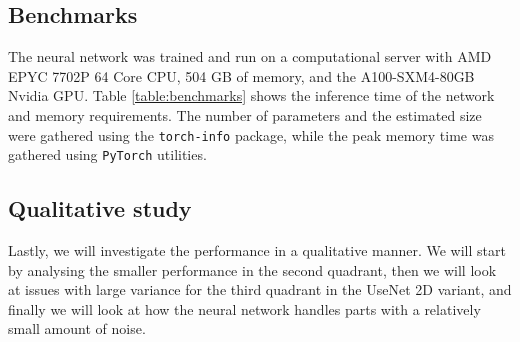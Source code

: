 \documentclass[
  digital,     %
  oneside,     %
  nosansbold,  %
  nocolorbold, %
  lof,         %
  lot,         %
]{fithesis4}
\begin{document}
\clearpage

\subsection*{Benchmarks}
The neural network was trained and run on a computational server with AMD EPYC 7702P 64 Core CPU, 504 GB of memory, and the A100-SXM4-80GB Nvidia GPU. Table \ref{table:benchmarks} shows the inference time of the network and memory requirements. The number of parameters and the estimated size were gathered using the \texttt{torch-info} package, while the peak memory time was gathered using \texttt{PyTorch} utilities.

\begin{table}[htbp]
    \centering
    \caption{Memory footprints and inference times for the investigated networks. Each inference time is an average of 200 runs on random data of shape $7\times 64 \times 64$ with batch size of 32. A sample corresponds to a single tile.}
    \label{table:benchmarks}
\end{table}

\subsection*{Qualitative study}
Lastly, we will investigate the performance in a qualitative manner. We will start by analysing the smaller performance in the second quadrant, then we will look at issues with large variance for the third quadrant in the UseNet 2D variant, and finally we will look at how the neural network handles parts with a relatively small amount of noise.
\end{document}
